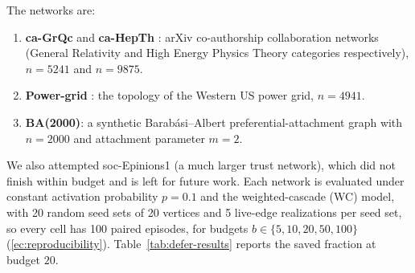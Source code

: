 \documentclass[preprint,11pt]{elsarticle}
\theoremstyle{definition}
\theoremstyle{remark}
\begin{document}
\noindent The networks are:

\begin{enumerate}
\item \textbf{ca-GrQc} and \textbf{ca-HepTh} \citep{leskovec2007}: arXiv
  co-authorship collaboration networks (General Relativity and High Energy
  Physics Theory categories respectively), $n=5241$ and $n=9875$.
\item \textbf{Power-grid} \citep{watts1998}: the topology of the Western
  US power grid, $n=4941$.
\item \textbf{BA(2000)}: a synthetic Barab\'asi--Albert preferential-attachment
  graph \citep{barabasi1999} with $n=2000$ and attachment parameter $m=2$.
\end{enumerate}

\noindent We also attempted soc-Epinions1 (a much larger trust network), which did not finish within budget and is left for future work. Each network is evaluated under constant activation probability $p=0.1$ and the weighted-cascade (WC) model, with 20 random seed sets of 20 vertices and 5 live-edge realizations per seed set, so every cell has 100 paired episodes, for budgets $b\in\{5,10,20,50,100\}$ (\ref{ec:reproducibility}). Table~\ref{tab:defer-results} reports the saved fraction at budget $20$.
\end{document}
